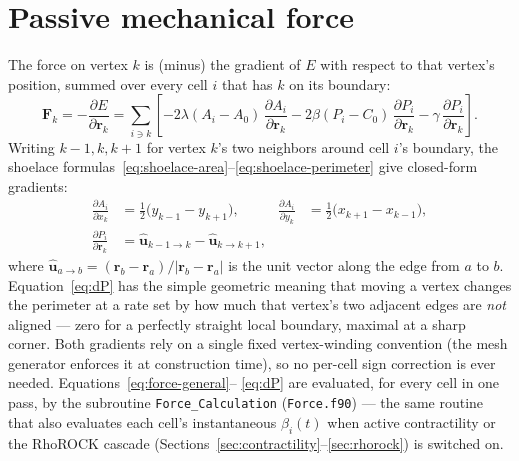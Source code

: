 \documentclass[11pt]{article}
\newcommand{\rvec}{\mathbf{r}}
\begin{document}
\section{Passive mechanical force}
\label{sec:force}

The force on vertex $k$ is (minus) the gradient of $E$ with respect to that vertex's
position, summed over every cell $i$ that has $k$ on its boundary:
\begin{equation}
  \mathbf{F}_k = -\frac{\partial E}{\partial \rvec_k}
  = \sum_{i \ni k} \left[
      -2\lambda(A_i - A_0)\,\frac{\partial A_i}{\partial \rvec_k}
      -2\beta(P_i - C_0)\,\frac{\partial P_i}{\partial \rvec_k}
      -\gamma\,\frac{\partial P_i}{\partial \rvec_k}
    \right].
  \label{eq:force-general}
\end{equation}
Writing $k{-}1,k,k{+}1$ for vertex $k$'s two neighbors around cell $i$'s boundary, the
shoelace formulas~\eqref{eq:shoelace-area}--\eqref{eq:shoelace-perimeter} give closed-form
gradients:
\begin{align}
  \frac{\partial A_i}{\partial x_k} &= \tfrac12\big(y_{k-1}-y_{k+1}\big), &
  \frac{\partial A_i}{\partial y_k} &= \tfrac12\big(x_{k+1}-x_{k-1}\big), \label{eq:dA}\\[4pt]
  \frac{\partial P_i}{\partial \rvec_k} &= \hat{\mathbf u}_{k-1\to k} - \hat{\mathbf u}_{k\to k+1},
  \label{eq:dP}
\end{align}
where $\hat{\mathbf u}_{a \to b} = (\rvec_b - \rvec_a)/|\rvec_b - \rvec_a|$ is the unit
vector along the edge from $a$ to $b$. Equation~\eqref{eq:dP} has the simple
geometric meaning that moving a vertex changes the perimeter at a rate set by how much
that vertex's two adjacent edges are \emph{not} aligned --- zero for a perfectly
straight local boundary, maximal at a sharp corner. Both gradients rely on a single
fixed vertex-winding convention (the mesh generator enforces it at construction time),
so no per-cell sign correction is ever needed. Equations~\eqref{eq:force-general}--
\eqref{eq:dP} are evaluated, for every cell in one pass, by the subroutine
\texttt{Force\_Calculation} (\texttt{Force.f90}) --- the same routine that also
evaluates each cell's instantaneous $\beta_i(t)$ when active contractility or the
RhoROCK cascade (Sections~\ref{sec:contractility}--\ref{sec:rhorock}) is switched on.

\end{document}
